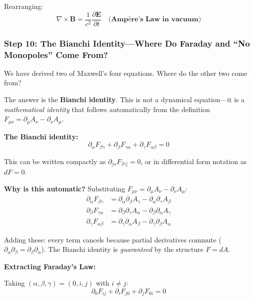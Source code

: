 Rearranging:
\begin{equation}
\boxed{\nabla \times \mathbf{B} = \frac{1}{c^2}\frac{\partial \mathbf{E}}{\partial t}} \quad \textbf{(Ampère's Law in vacuum)}
\end{equation}

\subsubsection{Step 10: The Bianchi Identity---Where Do Faraday and ``No Monopoles'' Come From?}

We have derived two of Maxwell's four equations. Where do the other two come from?

The answer is the \textbf{Bianchi identity}. This is not a dynamical equation---it is a \textit{mathematical identity} that follows automatically from the definition $F_{\mu\nu} = \partial_\mu A_\nu - \partial_\nu A_\mu$.

\textbf{The Bianchi identity:}
\begin{equation}
\partial_\alpha F_{\beta\gamma} + \partial_\beta F_{\gamma\alpha} + \partial_\gamma F_{\alpha\beta} = 0
\end{equation}

This can be written compactly as $\partial_{[\alpha} F_{\beta\gamma]} = 0$, or in differential form notation as $dF = 0$.

\textbf{Why is this automatic?} Substituting $F_{\mu\nu} = \partial_\mu A_\nu - \partial_\nu A_\mu$:
\begin{align}
\partial_\alpha F_{\beta\gamma} &= \partial_\alpha\partial_\beta A_\gamma - \partial_\alpha\partial_\gamma A_\beta \\
\partial_\beta F_{\gamma\alpha} &= \partial_\beta\partial_\gamma A_\alpha - \partial_\beta\partial_\alpha A_\gamma \\
\partial_\gamma F_{\alpha\beta} &= \partial_\gamma\partial_\alpha A_\beta - \partial_\gamma\partial_\beta A_\alpha
\end{align}

Adding these: every term cancels because partial derivatives commute ($\partial_\alpha\partial_\beta = \partial_\beta\partial_\alpha$). The Bianchi identity is \textit{guaranteed} by the structure $F = dA$.

\textbf{Extracting Faraday's Law:}

Taking $(\alpha, \beta, \gamma) = (0, i, j)$ with $i \neq j$:
\begin{equation}
\partial_0 F_{ij} + \partial_i F_{j0} + \partial_j F_{0i} = 0
\end{equation}

